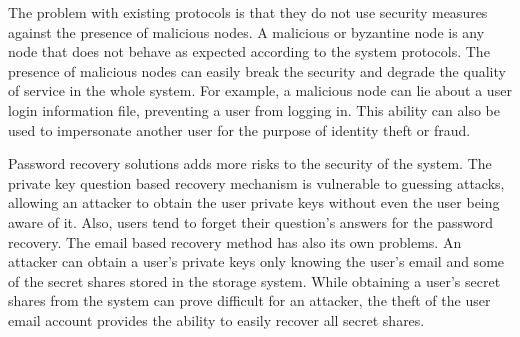 %



The problem with existing protocols is that they do not use security measures against the presence of malicious nodes.
A malicious or byzantine node is any node that does
not behave as expected according to the system protocols. The presence of
malicious nodes can easily break the security and degrade the quality of
service in the whole system. For example, a malicious node can lie about a user login
information file, preventing a user from logging in. This ability can also be
used to impersonate another user for the purpose of identity theft or fraud.

\label{sec:risks_password_recovery}
Password recovery solutions adds more risks to the security of the system.
The private key question based recovery mechanism is vulnerable to guessing
attacks, allowing an attacker to obtain the user private keys without even the user
being aware of it. Also, users tend to forget their question's answers for
the password recovery. The email based recovery method has also its own
problems. An attacker can obtain a user's private keys only knowing the user's
email and some of the secret shares stored in the storage system. While
obtaining a user's secret shares from the system can prove
difficult for an attacker, the theft of the user email
account provides the ability to easily recover all secret shares.

